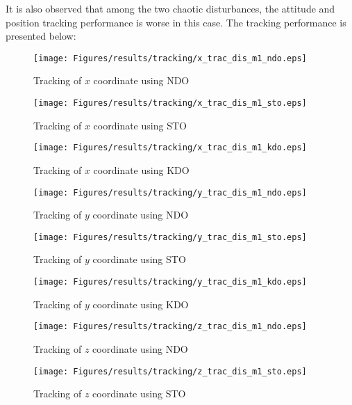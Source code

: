\documentclass{article}
\begin{document}
It is also observed that among the two chaotic disturbances, the attitude and position tracking performance is worse in this case. The tracking performance is presented below: 

\begin{figure}[H]
\centering
\texttt{[image: Figures/results/tracking/x\_trac\_dis\_m1\_ndo.eps]}
\caption{Tracking of $x$ coordinate using NDO}
\label{x_trac_dis_m1_ndo}
\end{figure}

\begin{figure}[H]
\centering
\texttt{[image: Figures/results/tracking/x\_trac\_dis\_m1\_sto.eps]}
\caption{Tracking of $x$ coordinate using STO}
\label{x_trac_dis_m1_sto}
\end{figure}

\begin{figure}[H]
\centering
\texttt{[image: Figures/results/tracking/x\_trac\_dis\_m1\_kdo.eps]}
\caption{Tracking of $x$ coordinate using KDO}
\label{x_trac_dis_m1_kdo}
\end{figure}

\begin{figure}[H]
\centering
\texttt{[image: Figures/results/tracking/y\_trac\_dis\_m1\_ndo.eps]}
\caption{Tracking of $y$ coordinate using NDO}
\label{y_trac_dis_m1_ndo}
\end{figure}

\begin{figure}[H]
\centering
\texttt{[image: Figures/results/tracking/y\_trac\_dis\_m1\_sto.eps]}
\caption{Tracking of $y$ coordinate using STO}
\label{y_trac_dis_m1_sto}
\end{figure}

\begin{figure}[H]
\centering
\texttt{[image: Figures/results/tracking/y\_trac\_dis\_m1\_kdo.eps]}
\caption{Tracking of $y$ coordinate using KDO}
\label{y_trac_dis_m1_kdo}
\end{figure}

\begin{figure}[H]
\centering
\texttt{[image: Figures/results/tracking/z\_trac\_dis\_m1\_ndo.eps]}
\caption{Tracking of $z$ coordinate using NDO}
\label{z_trac_dis_m1_ndo}
\end{figure}

\begin{figure}[H]
\centering
\texttt{[image: Figures/results/tracking/z\_trac\_dis\_m1\_sto.eps]}
\caption{Tracking of $z$ coordinate using STO}
\label{z_trac_dis_m1_sto}
\end{figure}
\end{document}
